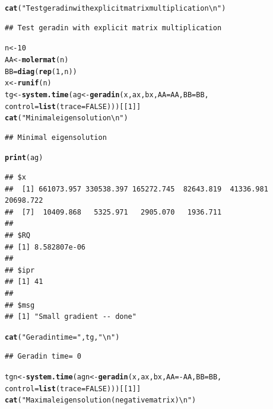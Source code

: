 \documentclass[10pt]{article}\usepackage[]{graphicx}\usepackage[]{color}
\makeatletter
\newcommand{\hlnum}[1]{\textcolor[rgb]{0.686,0.059,0.569}{#1}}%
\newcommand{\hlstr}[1]{\textcolor[rgb]{0.192,0.494,0.8}{#1}}%
\newcommand{\hlopt}[1]{\textcolor[rgb]{0,0,0}{#1}}%
\newcommand{\hlstd}[1]{\textcolor[rgb]{0.345,0.345,0.345}{#1}}%
\newcommand{\hlkwb}[1]{\textcolor[rgb]{0.69,0.353,0.396}{#1}}%
\newcommand{\hlkwc}[1]{\textcolor[rgb]{0.333,0.667,0.333}{#1}}%
\newcommand{\hlkwd}[1]{\textcolor[rgb]{0.737,0.353,0.396}{\textbf{#1}}}%
\newenvironment{kframe}{%
 \def\at@end@of@kframe{}%
 \ifinner\ifhmode%
  \def\at@end@of@kframe{\end{minipage}}%
  \begin{minipage}{\columnwidth}%
 \fi\fi%
 \def\FrameCommand##1{\hskip\@totalleftmargin \hskip-\fboxsep
 \colorbox{shadecolor}{##1}\hskip-\fboxsep
     \hskip-\linewidth \hskip-\@totalleftmargin \hskip\columnwidth}%
 \MakeFramed {\advance\hsize-\width
   \@totalleftmargin\z@ \linewidth\hsize
   \@setminipage}}%
 {\par\unskip\endMakeFramed%
 \at@end@of@kframe}
\newenvironment{knitrout}{}{} %
\makeatother
\begin{document}
\begin{knitrout}\scriptsize
{}\color{fgcolor}\begin{kframe}
\begin{alltt}
\hlkwd{cat}\hlstd{(}\hlstr{"Test geradin with explicit matrix multiplication\textbackslash{}n"}\hlstd{)}
\end{alltt}
\begin{verbatim}
## Test geradin with explicit matrix multiplication
\end{verbatim}
\begin{alltt}
\hlstd{n}\hlkwb{<-}\hlnum{10}
\hlstd{AA}\hlkwb{<-}\hlkwd{molermat}\hlstd{(n)}
\hlstd{BB}\hlkwb{=}\hlkwd{diag}\hlstd{(}\hlkwd{rep}\hlstd{(}\hlnum{1}\hlstd{,n))}
\hlstd{x}\hlkwb{<-}\hlkwd{runif}\hlstd{(n)}
\hlstd{tg}\hlkwb{<-}\hlkwd{system.time}\hlstd{(ag}\hlkwb{<-}\hlkwd{geradin}\hlstd{(x, ax, bx,} \hlkwc{AA}\hlstd{=AA,} \hlkwc{BB}\hlstd{=BB,}
   \hlkwc{control}\hlstd{=}\hlkwd{list}\hlstd{(}\hlkwc{trace}\hlstd{=}\hlnum{FALSE}\hlstd{)))[[}\hlnum{1}\hlstd{]]}
\hlkwd{cat}\hlstd{(}\hlstr{"Minimal eigensolution\textbackslash{}n"}\hlstd{)}
\end{alltt}
\begin{verbatim}
## Minimal eigensolution
\end{verbatim}
\begin{alltt}
\hlkwd{print}\hlstd{(ag)}
\end{alltt}
\begin{verbatim}
## $x
##  [1] 661073.957 330538.397 165272.745  82643.819  41336.981  20698.722
##  [7]  10409.868   5325.971   2905.070   1936.711
## 
## $RQ
## [1] 8.582807e-06
## 
## $ipr
## [1] 41
## 
## $msg
## [1] "Small gradient -- done"
\end{verbatim}
\begin{alltt}
\hlkwd{cat}\hlstd{(}\hlstr{"Geradin time="}\hlstd{,tg,}\hlstr{"\textbackslash{}n"}\hlstd{)}
\end{alltt}
\begin{verbatim}
## Geradin time= 0
\end{verbatim}
\begin{alltt}
\hlstd{tgn}\hlkwb{<-}\hlkwd{system.time}\hlstd{(agn}\hlkwb{<-}\hlkwd{geradin}\hlstd{(x, ax, bx,} \hlkwc{AA}\hlstd{=}\hlopt{-}\hlstd{AA,} \hlkwc{BB}\hlstd{=BB,}
   \hlkwc{control}\hlstd{=}\hlkwd{list}\hlstd{(}\hlkwc{trace}\hlstd{=}\hlnum{FALSE}\hlstd{)))[[}\hlnum{1}\hlstd{]]}
\hlkwd{cat}\hlstd{(}\hlstr{"Maximal eigensolution (negative matrix)\textbackslash{}n"}\hlstd{)}
\end{alltt}

\end{kframe}
\end{knitrout}
\end{document}
